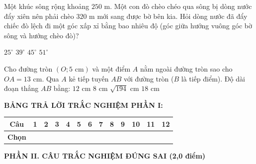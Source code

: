 \documentclass[12pt,a4paper]{article}
\begin{document}
\begin{ex}
Một khúc sông rộng khoảng $250\text{ m}$. Một con đò chèo chéo qua sông bị dòng nước đẩy xiên nên phải chèo $320\text{ m}$ mới sang được bờ bên kia. Hỏi dòng nước đã đẩy chiếc đò lệch đi một góc xấp xỉ bằng bao nhiêu độ (góc giữa hướng vuông góc bờ sông và hướng chèo đò)?
\begin{center}
\end{center}
\choice
{$25^\circ$}
{\True $39^\circ$}
{$45^\circ$}
{$51^\circ$}
\end{ex}

\begin{ex}
Cho đường tròn $(O; 5\text{ cm})$ và một điểm $A$ nằm ngoài đường tròn sao cho $OA = 13\text{ cm}$. Qua $A$ kẻ tiếp tuyến $AB$ với đường tròn ($B$ là tiếp điểm). Độ dài đoạn thẳng $AB$ bằng:
\choice
{\True $12\text{ cm}$}
{$8\text{ cm}$}
{$\sqrt{194}\text{ cm}$}
{$18\text{ cm}$}
\end{ex}


\vspace{1mm}
\noindent\textbf{BẢNG TRẢ LỜI TRẮC NGHIỆM PHẦN I:}
\begin{center}
\begin{tabular}{|c|c|c|c|c|c|c|c|c|c|c|c|c|}
\hline
\textbf{Câu} & \textbf{1} & \textbf{2} & \textbf{3} & \textbf{4} & \textbf{5} & \textbf{6} & \textbf{7} & \textbf{8} & \textbf{9} & \textbf{10} & \textbf{11} & \textbf{12} \\
\hline
\textbf{Chọn} & \rule{0pt}{0.65cm} & & & & & & & & & & & \\
\hline
\end{tabular}
\end{center}
\vspace{2mm}

\noindent\textbf{\large PHẦN II. CÂU TRẮC NGHIỆM ĐÚNG SAI (2,0 điểm)}
\end{document}
